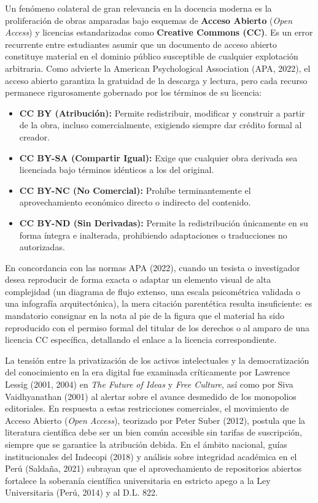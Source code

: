 Un fenómeno colateral de gran relevancia en la docencia moderna es la proliferación de obras amparadas bajo esquemas de \textbf{Acceso Abierto} (\textit{Open Access}) y licencias estandarizadas como \textbf{Creative Commons (CC)}. Es un error recurrente entre estudiantes asumir que un documento de acceso abierto constituye material en el dominio público susceptible de cualquier explotación arbitraria. Como advierte la American Psychological Association (APA, 2022), el acceso abierto garantiza la gratuidad de la descarga y lectura, pero cada recurso permanece rigurosamente gobernado por los términos de su licencia:
\begin{itemize}
    \item \textbf{CC BY (Atribución):} Permite redistribuir, modificar y construir a partir de la obra, incluso comercialmente, exigiendo siempre dar crédito formal al creador.
    \item \textbf{CC BY-SA (Compartir Igual):} Exige que cualquier obra derivada sea licenciada bajo términos idénticos a los del original.
    \item \textbf{CC BY-NC (No Comercial):} Prohíbe terminantemente el aprovechamiento económico directo o indirecto del contenido.
    \item \textbf{CC BY-ND (Sin Derivadas):} Permite la redistribución únicamente en su forma íntegra e inalterada, prohibiendo adaptaciones o traducciones no autorizadas.
\end{itemize}

En concordancia con las normas APA (2022), cuando un tesista o investigador desea reproducir de forma exacta o adaptar un elemento visual de alta complejidad (un diagrama de flujo extenso, una escala psicométrica validada o una infografía arquitectónica), la mera citación parentética resulta insuficiente: es mandatorio consignar en la nota al pie de la figura que el material ha sido reproducido con el permiso formal del titular de los derechos o al amparo de una licencia CC específica, detallando el enlace a la licencia correspondiente.

La tensión entre la privatización de los activos intelectuales y la democratización del conocimiento en la era digital fue examinada críticamente por Lawrence Lessig (2001, 2004) en \textit{The Future of Ideas} y \textit{Free Culture}, así como por Siva Vaidhyanathan (2001) al alertar sobre el avance desmedido de los monopolios editoriales. En respuesta a estas restricciones comerciales, el movimiento de Acceso Abierto (\textit{Open Access}), teorizado por Peter Suber (2012), postula que la literatura científica debe ser un bien común accesible sin tarifas de suscripción, siempre que se garantice la atribución debida. En el ámbito nacional, guías institucionales del Indecopi (2018) y análisis sobre integridad académica en el Perú (Saldaña, 2021) subrayan que el aprovechamiento de repositorios abiertos fortalece la soberanía científica universitaria en estricto apego a la Ley Universitaria (Perú, 2014) y al D.L. 822.

